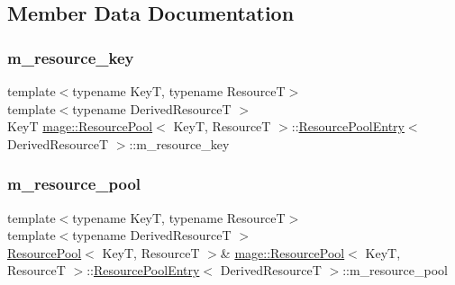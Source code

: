 \subsection{Member Data Documentation}
\hypertarget{structmage_1_1_resource_pool_1_1_resource_pool_entry_a2ca0b2ee479f64dbec5288a9a8b2b4c9}{}\label{structmage_1_1_resource_pool_1_1_resource_pool_entry_a2ca0b2ee479f64dbec5288a9a8b2b4c9} 
\subsubsection{\texorpdfstring{m\+\_\+resource\+\_\+key}{m\_resource\_key}}
{\footnotesize\ttfamily template$<$typename KeyT, typename ResourceT$>$ \\
template$<$typename Derived\+ResourceT $>$ \\
KeyT \hyperlink{classmage_1_1_resource_pool}{mage\+::\+Resource\+Pool}$<$ KeyT, ResourceT $>$\+::\hyperlink{structmage_1_1_resource_pool_1_1_resource_pool_entry}{Resource\+Pool\+Entry}$<$ Derived\+ResourceT $>$\+::m\+\_\+resource\+\_\+key\hspace{0.3cm}{\ttfamily [private]}}

\hypertarget{structmage_1_1_resource_pool_1_1_resource_pool_entry_a657a97767707dbb045f49440dff4c126}{}\label{structmage_1_1_resource_pool_1_1_resource_pool_entry_a657a97767707dbb045f49440dff4c126} 
\subsubsection{\texorpdfstring{m\+\_\+resource\+\_\+pool}{m\_resource\_pool}}
{\footnotesize\ttfamily template$<$typename KeyT, typename ResourceT$>$ \\
template$<$typename Derived\+ResourceT $>$ \\
\hyperlink{classmage_1_1_resource_pool}{Resource\+Pool}$<$ KeyT, ResourceT $>$\& \hyperlink{classmage_1_1_resource_pool}{mage\+::\+Resource\+Pool}$<$ KeyT, ResourceT $>$\+::\hyperlink{structmage_1_1_resource_pool_1_1_resource_pool_entry}{Resource\+Pool\+Entry}$<$ Derived\+ResourceT $>$\+::m\+\_\+resource\+\_\+pool\hspace{0.3cm}{\ttfamily [private]}}

